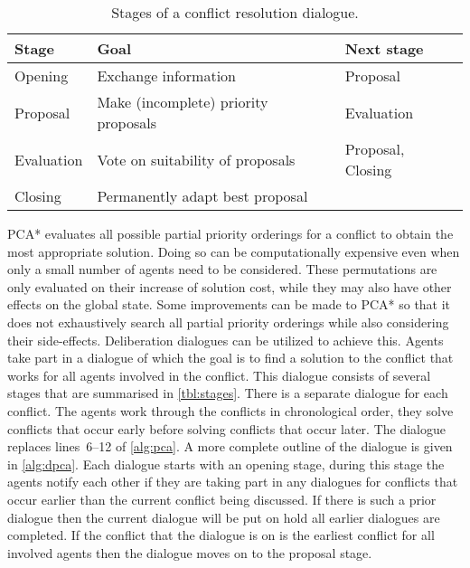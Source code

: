 \begin{table}
    \centering
    \caption{Stages of a conflict resolution dialogue.}
    \label{tbl:stages}
    \begin{tabular}{l|l|l}
        Stage & Goal & Next stage \\ \hline
        Opening & Exchange information & Proposal \\
        Proposal & Make (incomplete) priority proposals & Evaluation \\
        Evaluation & Vote on suitability of proposals & Proposal, Closing \\
        Closing & Permanently adapt best proposal & \\
    \end{tabular}
\end{table}

PCA* evaluates all possible partial priority orderings for a conflict to obtain 
the most appropriate solution. Doing so can be computationally expensive even 
when only a small number of agents need to be considered. These permutations 
are only evaluated on their increase of solution cost, while they may also have 
other effects on the global state. Some improvements can be made to PCA* so 
that it does not exhaustively search all partial priority orderings while also 
considering their side-effects. Deliberation dialogues can be utilized to 
achieve this.
Agents take part in a dialogue of which the goal is to find a solution to the
conflict that works for all agents involved in the conflict. This dialogue
consists of several stages that are summarised in \autoref{tbl:stages}. There 
is a separate dialogue for each conflict. The agents work through the
conflicts in chronological order, they solve conflicts that occur early before
solving conflicts that occur later. The dialogue replaces lines~6--12 of 
\autoref{alg:pca}. A more complete outline of the dialogue is given in 
\autoref{alg:dpca}.
Each dialogue starts with an opening stage, during this stage the agents notify 
each other if they are taking part
in any dialogues for conflicts that occur earlier than the current conflict
being discussed. If there is such a prior dialogue then the current dialogue
will be put on hold all earlier dialogues are completed. If the conflict that
the dialogue is on is the earliest conflict for all involved agents then the
dialogue moves on to the proposal stage.

